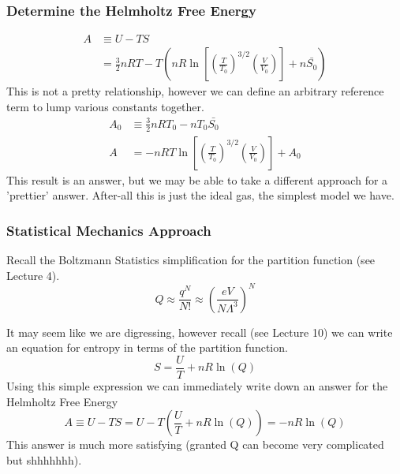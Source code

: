 \documentclass{article}
\begin{document}
\subsubsection*{Determine the Helmholtz Free Energy}
\begin{equation}
    \begin{split}
        A &\equiv U - TS \\
        &= \frac{3}{2}nRT - T \left(nR\ln\left[ \left(\frac{T}{T_0} \right)^{3/2} \left(\frac{V}{V_0} \right) \right ] + n\bar{S_0}\right)
    \end{split}
\end{equation}
This is not a pretty relationship, however we can define an arbitrary reference term to lump various constants together. 
\begin{equation}
    \begin{split}
        A_0 &\equiv \frac{3}{2}nRT_0 - nT_0\bar{S_0} \\
        A &= -nRT \ln\left[ \left(\frac{T}{T_0} \right)^{3/2} \left(\frac{V}{V_0} \right) \right ] + A_0
    \end{split}
\end{equation}
This result is an answer, but we may be able to take a different approach for a 'prettier' answer.
After-all this is just the ideal gas, the simplest model we have. 

\subsubsection*{Statistical Mechanics Approach}
Recall the Boltzmann Statistics simplification for the partition function (see Lecture 4). 
\begin{equation}
    Q \approx \frac{q^N}{N!} \approx \left(\frac{eV}{N\Lambda^3}\right)^N
\end{equation}

It may seem like we are digressing, however recall (see Lecture 10) we can write an equation for entropy in terms of the partition function.
\begin{equation}
    S = \frac{U}{T} + nR\ln(Q)
\end{equation}
Using this simple expression we can immediately write down an answer for the Helmholtz Free Energy 
\begin{equation}
    A \equiv U - TS = U - T \left(\frac{U}{T} + nR \ln(Q) \right) = -nR\ln(Q)
\end{equation}
This answer is much more satisfying (granted Q can become very complicated but shhhhhhh). 
\end{document}
